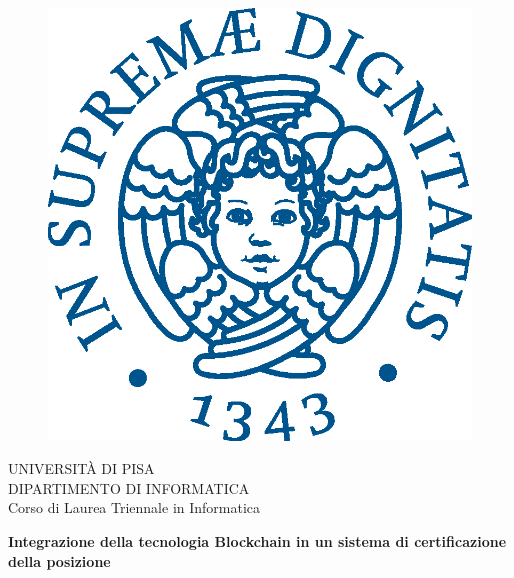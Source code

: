 \begin{titlepage}
\begin{figure}[!htb]
    \centering
    \includegraphics[keepaspectratio=true,scale=0.5]{cherubino_pant541.eps}
\end{figure}

\begin{center}
    \LARGE{UNIVERSITÀ DI PISA}
    \vspace{5mm}
    \\ \large{DIPARTIMENTO DI INFORMATICA }
    \vspace{5mm}
    \\ \LARGE{Corso di Laurea Triennale in Informatica}
\end{center}

\vspace{15mm}
\begin{center}
    {\huge{\bf Integrazione della tecnologia
Blockchain in un sistema di
certificazione della posizione\\\vspace{5mm}}}
\end{center}
\vspace{15mm}


\end{titlepage}
